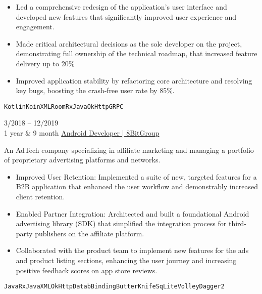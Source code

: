 \documentclass[9pt]{developercv} %
\begin{document}
\begin{entrylist}
{\begin{itemize}[leftmargin=*, labelsep=5pt]
			\item Led a comprehensive redesign of the application's user interface and developed new features that significantly improved user experience and engagement.
			\item Made critical architectural decisions as the sole developer on the project, demonstrating full ownership of the technical roadmap, that increased feature delivery up to 20\%
			\item Improved application stability by refactoring core architecture and resolving key bugs, boosting the crash-free user rate by 85\%.
		\end{itemize}
		\texttt{Kotlin}\slashsep\texttt{Koin}\slashsep\texttt{XML}\slashsep\texttt{Room}\slashsep\texttt{RxJava}\slashsep\texttt{OkHttp}\slashsep\texttt{GRPC}
        
        }
    \entry
		{3/2018 -- 12/2019\\\footnotesize{1 year \& 9 month}}
		{\href{https://dats.team/?lang=en}{Android Developer | 8BitGroup}}
		{ }
		{An AdTech company specializing in affiliate marketing and managing a portfolio of proprietary advertising platforms and networks.
		\begin{itemize}[leftmargin=*, labelsep=5pt]
			\setlength{\itemsep}{1pt}
            \item Improved User Retention: Implemented a suite of new, targeted features for a B2B application that enhanced the user workflow and demonstrably increased client retention.
			\item Enabled Partner Integration: Architected and built a foundational Android advertising library (SDK) that simplified the integration process for third-party publishers on the affiliate platform.
			\item Collaborated with the product team to implement new features for the ads and product listing sections, enhancing the user journey and increasing positive feedback scores on app store reviews.
		\end{itemize}
		\texttt{Java}\slashsep\texttt{RxJava}\slashsep\texttt{XML}\slashsep\texttt{OkHttp}\slashsep\texttt{DatabBinding}\slashsep\texttt{ButterKnife}\slashsep\texttt{SqLite}\slashsep\texttt{Volley}\slashsep\texttt{Dagger2}
        }
\end{entrylist}

\end{document}
